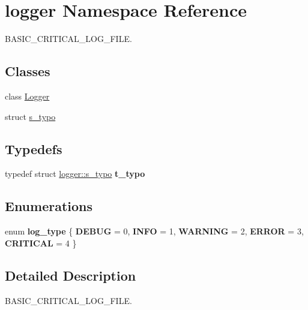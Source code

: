 \hypertarget{namespacelogger}{}\section{logger Namespace Reference}
\label{namespacelogger}


B\+A\+S\+I\+C\+\_\+\+C\+R\+I\+T\+I\+C\+A\+L\+\_\+\+L\+O\+G\+\_\+\+F\+I\+LE.  


\subsection*{Classes}
\begin{DoxyCompactItemize}
\item 
class \hyperlink{classlogger_1_1_logger}{Logger}
\item 
struct \hyperlink{structlogger_1_1s__typo}{s\+\_\+typo}
\end{DoxyCompactItemize}
\subsection*{Typedefs}
\begin{DoxyCompactItemize}
\item 
\mbox{\label{namespacelogger_a64d46b986c760191eb26eef4fc4c26d5}} 
typedef struct \hyperlink{structlogger_1_1s__typo}{logger\+::s\+\_\+typo} {\bfseries t\+\_\+typo}
\end{DoxyCompactItemize}
\subsection*{Enumerations}
\begin{DoxyCompactItemize}
\item 
\mbox{\label{namespacelogger_ae1c0c15733b1d5c33bffa9e7b81d4e73}} 
enum {\bfseries log\+\_\+type} \{ \newline
{\bfseries D\+E\+B\+UG} = 0, 
{\bfseries I\+N\+FO} = 1, 
{\bfseries W\+A\+R\+N\+I\+NG} = 2, 
{\bfseries E\+R\+R\+OR} = 3, 
\newline
{\bfseries C\+R\+I\+T\+I\+C\+AL} = 4
 \}
\end{DoxyCompactItemize}


\subsection{Detailed Description}
B\+A\+S\+I\+C\+\_\+\+C\+R\+I\+T\+I\+C\+A\+L\+\_\+\+L\+O\+G\+\_\+\+F\+I\+LE. 

